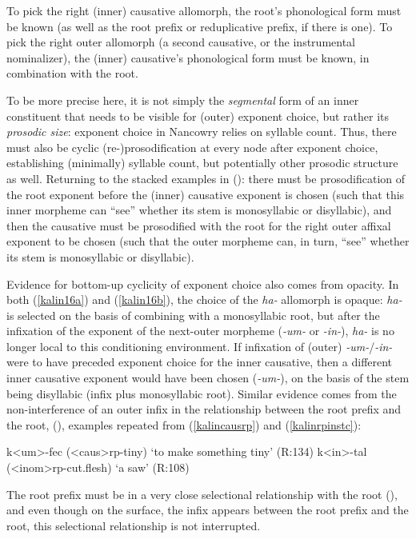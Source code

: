 \documentclass[output=paper]{langscibook}
\newcounter{nexttmp}    %
\newcounter{lasttmp}    %
\newcommand{\Next}{\setcounter{nexttmp}{\value{equation}}\stepcounter{nexttmp}(\thenexttmp)\xspace}
\newcommand{\Last}{\setcounter{lasttmp}{\value{equation}}(\thelasttmp)\xspace}
\begin{document}
\noindent To pick the right (inner) causative allomorph, the root's phonological form must be known (as well as the root prefix or reduplicative prefix, if there is one). To pick the right outer allomorph (a second causative, or the instrumental nominalizer), the (inner) causative's phonological form must be known, in combination with the root.

To be more precise here, it is not simply the {\it segmental} form of an inner constituent that needs to be visible for (outer) exponent choice, but rather its {\it prosodic size}: exponent choice in Nancowry relies on syllable count. Thus, there must also be cyclic (re-)prosodification at every node after exponent choice, establishing (minimally) syllable count, but potentially other prosodic structure as well. Returning to the stacked examples in \Last: there must be prosodification of the root exponent before the (inner) causative exponent is chosen (such that this inner morpheme can ``see'' whether its stem is monosyllabic or disyllabic), and then the causative must be prosodified with the root for the right outer affixal exponent to be chosen (such that the outer morpheme can, in turn, ``see'' whether its stem is monosyllabic or disyllabic). 

Evidence for bottom-up cyclicity of exponent choice also comes from opacity. In both (\ref{kalin16a}) and (\ref{kalin16b}), the choice of the \textit{ha-} allomorph is opaque: \textit{ha-} is selected on the basis of combining with a monosyllabic root, but after the infixation of the exponent of the next-outer morpheme (\textit{-um-} or \textit{-in-}), \textit{ha-} is no longer local to this conditioning environment. If infixation of (outer)  \textit{-um-}/\textit{-in-} were to have preceded exponent choice for the inner causative, then a different inner causative exponent would have been chosen (\textit{-um-}), on the basis of the stem being disyllabic (infix plus monosyllabic root). Similar evidence comes from the non-interference of an outer infix in the relationship between the root prefix and the root, \Next, examples repeated from (\ref{kalincausrp}) and (\ref{kalinrpinstc}):

\ea \label{kalin17}
\ea k<um>-fec ({\sc <caus>}{\sc rp-}tiny) \hfill  `to make something tiny'  (R:134)\label{kalin17a}
\ex k<in>-tal ({\sc <inom>rp-}cut.flesh) \hfill `a saw' (R:108)\label{kalin17b}
\z
\z

\noindent The root prefix must be in a very close selectional relationship with the root (), and even though on the surface, the infix appears between the root prefix and the root, this selectional relationship is not interrupted. 
\end{document}
